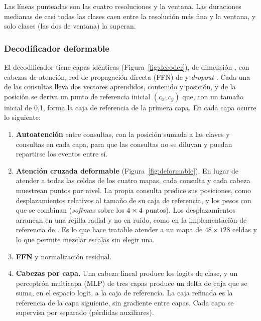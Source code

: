 Las líneas punteadas son las cuatro resoluciones y la ventana. Las duraciones
medianas de casi todas las clases caen entre la resolución más fina y la ventana,
y solo \mClassesOverWindow{} clases (las dos de ventana) la superan.

\subsubsection{Decodificador deformable}

El decodificador tiene \mDecoderLayers{} capas idénticas
(Figura~\ref{fig:decoder}), de dimensión \mDim{}, con \mHeads{} cabezas de
atención, red de propagación directa (FFN) de \mFfn{} y \textit{dropout} \mDropout{}. Cada una de las
\mQueries{} consultas lleva dos vectores aprendidos, contenido y posición, y de
la posición se deriva un punto de referencia inicial $(c_x, c_y)$ que, con un
tamaño inicial de 0,1, forma la caja de referencia de la primera capa. En cada
capa ocurre lo siguiente:

\begin{enumerate}[nosep]
    \item \textbf{Autoatención} entre consultas, con la posición sumada a las
          claves y consultas en cada capa, para que las consultas no se diluyan y
          puedan repartirse los eventos entre sí.
    \item \textbf{Atención cruzada deformable} (Figura~\ref{fig:deformable}). En
          lugar de atender a todas las celdas de los cuatro mapas, cada consulta
          y cada cabeza muestrean \mPoints{} puntos por nivel. La propia consulta
          predice sus posiciones, como desplazamientos relativos al tamaño de su
          caja de referencia, y los pesos con que se combinan
          (\textit{softmax} sobre los $4 \times 4$ puntos). Los
          desplazamientos arrancan en una rejilla radial y no en ruido, como en
          la implementación de referencia de \citet{zhu_deformable_2021}. Es lo que hace tratable
          atender a un mapa de $48 \times 128$ celdas y lo que permite mezclar
          escalas sin elegir una.
    \item \textbf{FFN} y normalización residual.
    \item \textbf{Cabezas por capa.} Una cabeza lineal produce los \nClasses{}
          logits de clase, y un perceptrón multicapa (MLP) de tres capas produce
          un delta de caja que se suma, en el espacio logit, a la caja de
          referencia. La caja refinada es la referencia de la capa siguiente, sin
          gradiente entre capas. Cada capa
          se supervisa por separado (pérdidas auxiliares).
\end{enumerate}

